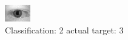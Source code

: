 \begin{figure}[h!]
\begin{center}
\includegraphics[width=0.60\columnwidth]{figures/ID625_class_2_target_3.png}
\end{center}
\caption{ Classification: 2 actual target: 3}
\label{fig:ID625_class_2_target_3}
\end{figure}
